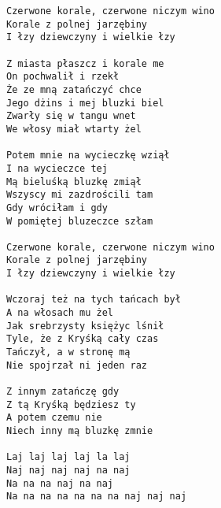 \documentclass[12pt]{article}
\begin{document}
\begin{verbatim}
Czerwone korale, czerwone niczym wino
Korale z polnej jarzębiny
I łzy dziewczyny i wielkie łzy

Z miasta płaszcz i korale me
On pochwalił i rzekł
Że ze mną zatańczyć chce
Jego dżins i mej bluzki biel
Zwarły się w tangu wnet
We włosy miał wtarty żel

Potem mnie na wycieczkę wziął
I na wycieczce tej
Mą bieluśką bluzkę zmiął
Wszyscy mi zazdrościli tam
Gdy wróciłam i gdy
W pomiętej bluzeczce szłam

Czerwone korale, czerwone niczym wino
Korale z polnej jarzębiny
I łzy dziewczyny i wielkie łzy

Wczoraj też na tych tańcach był
A na włosach mu żel
Jak srebrzysty księżyc lśnił
Tyle, że z Kryśką cały czas
Tańczył, a w stronę mą
Nie spojrzał ni jeden raz

Z innym zatańczę gdy
Z tą Kryśką będziesz ty
A potem czemu nie
Niech inny mą bluzkę zmnie

Laj laj laj laj la laj
Naj naj naj naj na naj
Na na na naj na naj
Na na na na na na na naj naj naj
\end{verbatim}
\clearpage
\end{document}
